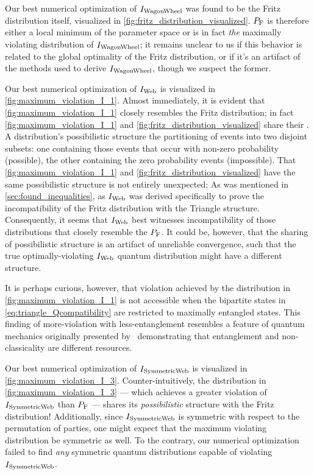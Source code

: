 \documentclass[aps, 10pt, english, twoside, pra, nofootinbib, tightenlines, longbibliography, superscriptaddress]{revtex4-1}
\begin{document}
    Our best numerical optimization of $I_\text{WagonWheel}$ was found to be the Fritz distribution itself, visualized in \cref{fig:fritz_distribution_visualized}. $\prob[\fritz]$ is therefore either a local minimum of the parameter space or is in fact \textit{the} maximally violating distribution of $I_\text{WagonWheel}$; it remains unclear to us if this behavior is related to the global optimality of the Fritz distribution, or if it's an artifact of the methods used to derive $I_\text{WagonWheel}$, though we suspect the former.

    Our best numerical optimization of $I_\text{Web}$ is visualized in \cref{fig:maximum_violation_I_1}. Almost immediately, it is evident that \cref{fig:maximum_violation_I_1} closely resembles the Fritz distribution; in fact \cref{fig:maximum_violation_I_1} and \cref{fig:fritz_distribution_visualized} share their . A distribution's possibilistic structure the partitioning of events into two disjoint subsets: one containing those events that occur with non-zero probability (possible), the other containing the zero probability events (impossible).
    That \cref{fig:maximum_violation_I_1} and \cref{fig:fritz_distribution_visualized} have the same possibilistic structure is not entirely unexpected;  As was mentioned in \cref{sec:found_inequalities}, as $I_\text{Web}$ was derived specifically to prove the incompatibility of the Fritz distribution with the Triangle structure. Consequently, it seems that $I_\text{Web}$ best witnesses incompatibility of those distributions that closely resemble the $\prob[\fritz]$. It could be, however, that the sharing of possibilistic structure is an artifact of unreliable convergence, such that the true optimally-violating $I_\text{Web}$ quantum distribution might have a different structure.

    It is perhaps curious, however, that violation achieved by the distribution in \cref{fig:maximum_violation_I_1} is not accessible when the bipartite states in \cref{eq:triangle_Qcompatibility} are restricted to maximally entangled states. This finding of more-violation with less-entanglement resembles a feature of quantum mechanics originally presented by~\citet{Methot_2006} demonstrating that entanglement and non-classicality are different resources.

    Our best numerical optimization of $I_\text{SymmetricWeb}$ is visualized in \cref{fig:maximum_violation_I_3}. Counter-intuitively, the distribution in \cref{fig:maximum_violation_I_3} --- which achieves a greater violation of $I_\text{SymmetricWeb}$ than $\prob[\fritz]$ --- shares its \textit{possibilistic} structure with the Fritz distribution! Additionally, since $I_\text{SymmetricWeb}$ is symmetric with respect to the permutation of parties, one might expect that the maximum violating distribution be symmetric as well. To the contrary, our numerical optimization failed to find \emph{any} symmetric quantum distributions capable of violating $I_\text{SymmetricWeb}$.
\end{document}
